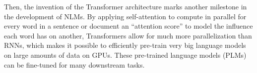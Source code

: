 \documentclass[conference]{IEEEtran}
\begin{document}
\iffalse
Fig \ref{fig:rnnlm} shows the high-level idea of this framework.
\begin{figure}[h]
\begin{center}
    \includegraphics [scale=0.6] {img/rnnlm.png}
\end{center}
  \caption{Feedforward neural network 4-gram model (on the left) and Recurrent
neural network language model (on the right), proposed by Mikolov et al. Courtesy of \cite{mikolov2011strategies}.}
\label{fig:rnnlm}
\end{figure}
\fi

Then, the invention of the Transformer architecture \cite{vaswani2017attention} marks another milestone in the development of NLMs. By applying self-attention to compute in parallel for every word in a sentence or document an ``attention score'' to model the influence each word has on another, Transformers allow for much more parallelization than RNNs, which makes it possible to efficiently pre-train very big language models on large amounts of data on GPUs. These pre-trained language models (PLMs) can be fine-tuned for many downstream tasks.    
\end{document}
